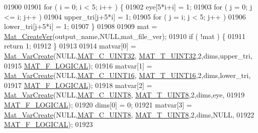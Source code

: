 \begin{DoxyCode}
{{{{{01900 
01901     \textcolor{keywordflow}{for} ( i = 0; i < 5; i++ ) \{
01902         eye[5*i+i] = 1;
01903         \textcolor{keywordflow}{for} ( j = 0; j <= i; j++ )
01904             upper\_tri[j+5*i] = 1;
01905         \textcolor{keywordflow}{for} ( j = i; j < 5; j++ )
01906             lower\_tri[j+5*i] = 1;
01907     \}
01908 
01909     mat = \hyperlink{group___m_a_t_ga22d404f203af7869c841400e7ad247cf}{Mat\_CreateVer}(output\_name,NULL,mat\_file\_ver);
01910     \textcolor{keywordflow}{if} ( !mat ) \{
01911         \textcolor{keywordflow}{return} 1;
01912     \}
01913 
01914     matvar[0] = \hyperlink{group___m_a_t_ga1c54a84bb4d810c6fccdb8869489eac4}{Mat\_VarCreate}(NULL,\hyperlink{group___m_a_t_ggad4d60ae7b709fc81bfd744fb4c857c40a9a17a7edd45b19ef68197db81b27e816}{MAT\_C\_UINT32},
      \hyperlink{group___m_a_t_ggacf7b3b879282b7ab3a51190e49bf3453aa397e285a23fe240368b752897652c6a}{MAT\_T\_UINT32},2,dims,upper\_tri,
01915                               \hyperlink{group___m_a_t_ggab9d6ef9e3ddca78a317b173f01d53fbba57eb5c6e200bcbc0f1b7982f29a169c2}{MAT\_F\_LOGICAL});
01916     matvar[1] = \hyperlink{group___m_a_t_ga1c54a84bb4d810c6fccdb8869489eac4}{Mat\_VarCreate}(NULL,\hyperlink{group___m_a_t_ggad4d60ae7b709fc81bfd744fb4c857c40a8bede21dbf6c1edc0bbccc1481bccae7}{MAT\_C\_UINT16},
      \hyperlink{group___m_a_t_ggacf7b3b879282b7ab3a51190e49bf3453a05bc7af7680aa68be95126ae0a4c2e31}{MAT\_T\_UINT16},2,dims,lower\_tri,
01917                               \hyperlink{group___m_a_t_ggab9d6ef9e3ddca78a317b173f01d53fbba57eb5c6e200bcbc0f1b7982f29a169c2}{MAT\_F\_LOGICAL});
01918     matvar[2] = \hyperlink{group___m_a_t_ga1c54a84bb4d810c6fccdb8869489eac4}{Mat\_VarCreate}(NULL,\hyperlink{group___m_a_t_ggad4d60ae7b709fc81bfd744fb4c857c40a81270f8093cb4808e992c1d29d84d4e3}{MAT\_C\_UINT8},
      \hyperlink{group___m_a_t_ggacf7b3b879282b7ab3a51190e49bf3453a01c1bd7db68f90552862eb5d311be408}{MAT\_T\_UINT8},2,dims,eye,
01919                               \hyperlink{group___m_a_t_ggab9d6ef9e3ddca78a317b173f01d53fbba57eb5c6e200bcbc0f1b7982f29a169c2}{MAT\_F\_LOGICAL});
01920     dims[0] = 0;
01921     matvar[3] = \hyperlink{group___m_a_t_ga1c54a84bb4d810c6fccdb8869489eac4}{Mat\_VarCreate}(NULL,\hyperlink{group___m_a_t_ggad4d60ae7b709fc81bfd744fb4c857c40a81270f8093cb4808e992c1d29d84d4e3}{MAT\_C\_UINT8},
      \hyperlink{group___m_a_t_ggacf7b3b879282b7ab3a51190e49bf3453a01c1bd7db68f90552862eb5d311be408}{MAT\_T\_UINT8},2,dims,NULL,
01922                               \hyperlink{group___m_a_t_ggab9d6ef9e3ddca78a317b173f01d53fbba57eb5c6e200bcbc0f1b7982f29a169c2}{MAT\_F\_LOGICAL});
01923 
}}}}}
\end{DoxyCode}
